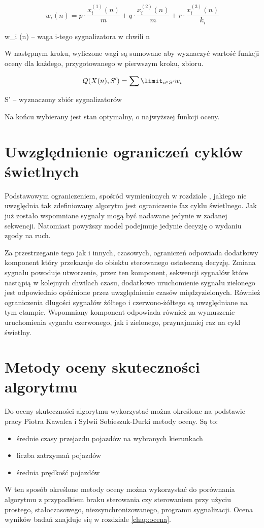 \begin{equation}
	w_{i} (n) = p \cdot \frac{x^{(1)}_{i} (n)}{m} + q \cdot \frac{x^{(2)}_{i} (n)}{m} + r \cdot \frac{x^{(3)}_{i} (n)}{k_{i}}
\end{equation}

w_{i} (n) \textrm{ -- waga i-tego sygnalizatora w chwili n}

\vspace{0.5cm}
W następnym kroku, wyliczone wagi są sumowane aby wyznaczyć wartość funkcji oceny dla każdego, przygotowanego w pierwszym kroku, zbioru.

\begin{equation}
	Q (X(n), S') = \sum\limit_{i \in S'} w_{i}
\end{equation}

S' \textrm{ -- wyznaczony zbiór sygnalizatorów}

\vspace{0.5cm}
Na końcu wybierany jest stan optymalny, o najwyższej funkcji oceny.

\section{Uwzględnienie ograniczeń cyklów świetlnych}
Podstawowym ograniczeniem, spośród wymienionych w rozdziale \label{sec:model_ograniczenia}, jakiego nie uwzględnia tak zdefiniowany algorytm jest ograniczenie faz cyklu świetlnego. Jak już zostało wspomniane  sygnały mogą być nadawane jedynie w zadanej sekwencji. Natomiast powyższy model podejmuje jedynie decyzję o wydaniu zgody na ruch.

Za przestrzeganie tego jak i innych, czasowych, ograniczeń odpowiada dodatkowy komponent który przekazuje do obiektu sterowanego ostateczną decyzję. Zmiana sygnału powoduje utworzenie, przez ten komponent, sekwencji sygnałów które nastąpią w kolejnych chwilach czasu, dodatkowo uruchomienie sygnału zielonego jest odpowiednio opóźnione przez uwzględnienie czasów międzyzielonych. Również ograniczenia długości sygnałów żółtego i czerwono-żółtego są uwzględniane na tym etampie. Wspomniany komponent odpowiada również za wymuszenie uruchomienia sygnału czerwonego, jak i zielonego, przynajmniej raz na cykl świetlny.

\section{Metody oceny skuteczności algorytmu}
Do oceny skuteczności algorytmu wykorzystać można określone na podstawie pracy Piotra Kawalca i Sylwii Sobieszuk-Durki \cite{kawalec+sobieszuk-durka} metody oceny. Są to:
\begin{itemize}
	\item średnie czasy przejazdu pojazdów na wybranych kierunkach
	\item liczba zatrzymań pojazdów
	\item średnia prędkość pojazdów
\end{itemize}

W ten sposób określone metody oceny można wykorzystać do porównania algorytmu z przypadkiem braku sterowania czy sterowaniem przy użyciu prostego, stałoczasowego, niezsynchronizowanego, programu sygnalizacji. Ocena wyników badań znajduje się w rozdziale \ref{chap:ocena}.